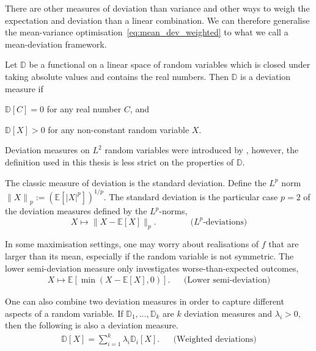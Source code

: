 \documentclass[main.tex]{subfiles}
\begin{document}
There are other measures of deviation than variance and other ways to
weigh the expectation and deviation than a linear combination. We can
therefore generalise the mean-variance
optimisation~\eqref{eq:mean_dev_weighted} to what we call a mean-deviation framework.

\begin{mydef}
  Let $\mathbb{D}$ be a functional on a linear space of random
  variables which is closed under taking absolute values and contains
  the real numbers.
  Then $\mathbb{D}$ is a deviation measure if
  \begin{enumerate}
    \begin{samepage}
    \item $\mathbb{D}[C] = 0$ for any real number $C$, and
    \item $\mathbb{D}[X]>0$ for any non-constant random variable $X$.
    \end{samepage}
  \end{enumerate}
\end{mydef}
Deviation measures on $L^2$ random variables were introduced by
\citet{rockafellar2006generalized}, however, the definition used in this thesis
is less strict on the properties of $\mathbb{D}$.

\begin{example}
  The classic measure of deviation is the standard deviation.
  Define the $L^p$ norm ${\|X\|}_p := {\left( \mathbb{E}[{|X|}^p]
    \right)}^{1/p}$.
  The standard deviation is
  the particular case $p=2$ of the deviation measures defined by
  the $L^p$-norms,
  \begin{equation}
    X\mapsto
    \|X-\mathbb{E}[X]\|_p.
    \qquad\qquad \text{($L^p$-deviations)}
  \end{equation}

  In some maximisation settings, one may worry about
  realisations of $f$ that are larger than its mean, especially if the
  random variable is not symmetric.
  The lower semi-deviation measure only investigates
  worse-than-expected outcomes,
  \begin{align}
    X\mapsto \mathbb{E}[\min(X-\mathbb{E}[X],0)].
    &&\text{(Lower semi-deviation)}
  \end{align}

  One can also combine two deviation measures in order to capture
  different aspects of a random variable.
  If $\mathbb{D}_1,\dots,\mathbb{D}_k$ are $k$ deviation measures and
  $\lambda_i>0$, then the following
  is also a deviation measure.
  \begin{align}
    \mathbb{D}[X]=\sum_{i=1}^k\lambda_i\mathbb{D}_i[X].
    &&\text{(Weighted deviations)}
  \end{align}
\end{example}
\end{document}
